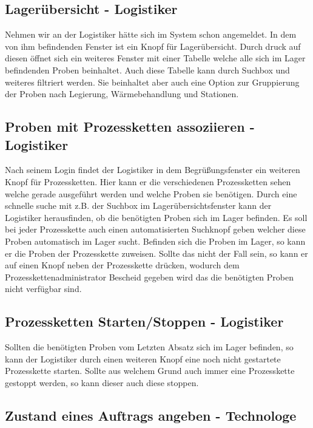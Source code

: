 \documentclass[enabledeprecatedfontcommands,fontsize=12pt,paper=a4,twoside]{scrartcl}
\begin{document}
\subsection{Lagerübersicht - Logistiker}

Nehmen wir an der Logistiker hätte sich im System schon angemeldet.
In dem von ihm befindenden Fenster ist ein Knopf für Lagerübersicht. Durch druck auf diesen öffnet sich ein weiteres Fenster mit einer Tabelle welche alle sich im Lager befindenden Proben beinhaltet. Auch diese Tabelle kann durch Suchbox und weiteres filtriert werden. Sie beinhaltet aber auch eine Option zur Gruppierung der Proben nach Legierung, Wärmebehandlung und Stationen.

\subsection{Proben mit Prozessketten assoziieren - Logistiker}

Nach seinem Login findet der Logistiker in dem Begrüßungsfenster ein weiteren Knopf für Prozessketten. Hier kann er die verschiedenen Prozessketten sehen welche gerade ausgeführt werden und welche Proben sie benötigen. Durch eine schnelle suche mit z.B. der Suchbox im Lagerübersichtsfenster kann der Logistiker herausfinden, ob die benötigten Proben sich im Lager befinden. Es soll bei jeder Prozesskette auch einen automatisierten Suchknopf geben welcher diese Proben automatisch im Lager sucht.
Befinden sich die Proben im Lager, so kann er die Proben der Prozesskette zuweisen. Sollte das nicht der Fall sein, so kann er auf einen Knopf neben der Prozesskette drücken, wodurch dem Prozesskettenadministrator Bescheid gegeben wird das die benötigten Proben nicht verfügbar sind.
 
\subsection{Prozessketten Starten/Stoppen - Logistiker}

Sollten die benötigten Proben vom Letzten Absatz sich im Lager befinden, so kann der Logistiker durch einen weiteren Knopf eine noch nicht gestartete Prozesskette starten.
Sollte aus welchem Grund auch immer eine Prozesskette gestoppt werden, so kann dieser auch diese stoppen.

\subsection{Zustand eines Auftrags angeben - Technologe}
\end{document}

